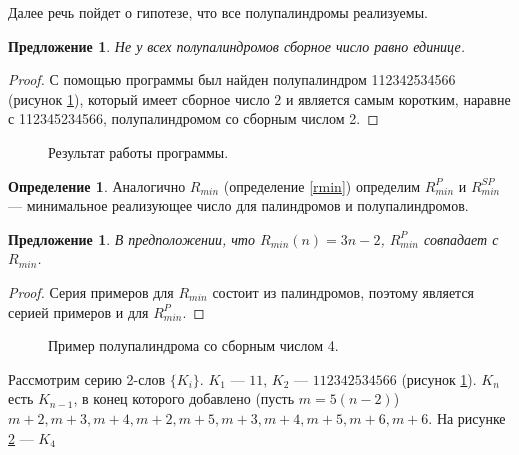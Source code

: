 \documentclass[a4paper,fleqn,12pt,top=0pt]{article}
\theoremstyle{plain}
\newtheorem{proposition}[theorem]{Предложение}
\theoremstyle{definition}
\newtheorem{definition}[theorem]{Определение}
\theoremstyle{remark}
\begin{document}
Далее речь пойдет о гипотезе, что все полупалиндромы реализуемы.

\begin{proposition}
    Не у всех полупалиндромов сборное число равно единице.
\end{proposition}
\begin{proof}
    С помощью программы \cite[\texttt{assembly\_number\_2.cpp}]{github} был найден полупалиндром 112342534566 (рисунок \ref{an_2}), который имеет сборное число $2$ и является самым коротким, наравне с 112345234566, полупалиндромом со сборным числом 2.
\end{proof}

\begin{figure}
    \centering
    
    \caption{Результат работы программы.}
    \label{an_2}
\end{figure}

\begin{definition}
    Аналогично $R_{min}$ (определение \ref{rmin}) определим $R_{min}^P$ и $R_{min}^{SP}$ --- минимальное реализующее число для палиндромов и полупалиндромов.
\end{definition}

\begin{proposition}
    В предположении, что $R_{min}(n) = 3n - 2$, $R_{min}^P$ совпадает с $R_{min}$.
\end{proposition}
\begin{proof}
    Серия примеров для $R_{min}$ состоит из палиндромов, поэтому является серией примеров и для $R_{min}^P$.
\end{proof}

\begin{figure}
    \centering
    
    \caption{Пример полупалиндрома со сборным числом 4.}
    \label{an_4}
\end{figure}

Рассмотрим серию 2-слов $\{K_i\}$. $K_1$ ---  $11$, $K_2$ --- $112342534566$ (рисунок \ref{an_2}). $K_n$ есть $K_{n - 1}$, в конец которого добавлено (пусть $m = 5(n - 2)$) $m + 2, m + 3, m + 4, m + 2, m + 5, m + 3, m + 4, m + 5, m + 6, m + 6$. На рисунке \ref{an_4} --- $K_4$
\end{document}
